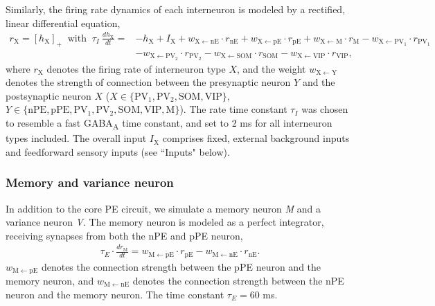 \documentclass[10pt,a4paper,draft]{article}
\begin{document}
Similarly, the firing rate dynamics of each interneuron is modeled by a rectified, linear differential equation,
%
\begin{align}
\label{eq:RateEqINs}
r_\mathrm{X} = [h_\mathrm{X}]_+ \ \mbox{ with }\ \tau_I\ \frac{dh_\mathrm{X}}{dt} =& -h_\mathrm{X} + I_{\mathrm{X}} + w_\mathrm{X\leftarrow nE}\cdot r_\mathrm{nE} + w_\mathrm{X\leftarrow pE}\cdot r_\mathrm{pE}  +  w_\mathrm{X\leftarrow M}\cdot  r_\mathrm{M} - w_\mathrm{X\leftarrow PV_1}\cdot r_\mathrm{PV_1}  \nonumber\\
&- w_\mathrm{X\leftarrow PV_2}\cdot r_\mathrm{PV_2}  - w_\mathrm{X\leftarrow SOM}\cdot r_\mathrm{SOM} -  w_\mathrm{X\leftarrow VIP}\cdot r_\mathrm{VIP},
\end{align}
%
where $r_\mathrm{X}$ denotes the firing rate of interneuron type $X$, and the weight $w_\mathrm{X\leftarrow Y}$ denotes the strength of connection between the presynaptic neuron $Y$ and the postsynaptic neuron $X$ ($X \in \lbrace \mathrm{PV_1}, \mathrm{PV_2}, \mathrm{SOM}, \mathrm{VIP}\rbrace$, $Y\in \lbrace \mathrm{nPE}, \mathrm{pPE}, \mathrm{PV_1}, \mathrm{PV_2}, \mathrm{SOM}, \mathrm{VIP}, \mathrm{M}\rbrace$). The rate time constant $\tau_I$ was chosen to resemble a fast GABA\textsubscript{A} time constant, and set to 2 ms for all interneuron types included. The overall input $I_\mathrm{X}$ comprises fixed, external background inputs and feedforward sensory inputs (see ``Inputs" below).

\subsubsection{Memory and variance neuron}
%
In addition to the core PE circuit, we simulate a memory neuron \textit{M} and a variance neuron \textit{V}. The memory neuron is modeled as a perfect integrator, receiving synapses from both the nPE and pPE neuron,
%
\begin{align}
\tau_E \cdot \frac{dr_\mathrm{M}}{dt} = w_\mathrm{M\leftarrow pE} \cdot r_\mathrm{pE} - w_\mathrm{M\leftarrow nE} \cdot r_\mathrm{nE}.
\end{align}
%
$w_\mathrm{M\leftarrow pE}$ denotes the connection strength between the pPE neuron and the memory neuron, and  $w_\mathrm{M\leftarrow nE}$ denotes the connection strength between the nPE neuron and the memory neuron. The time constant $\tau_E = 60$ ms.
\end{document}
